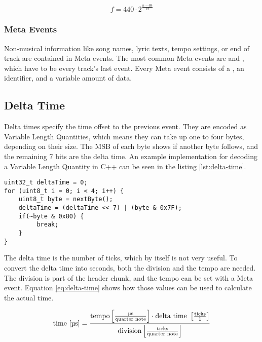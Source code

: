 \begin{equation}\label{eq:note-number}
    f = 440 \cdot 2^{\frac{n - 69}{12}}
\end{equation}

\subsubsection{Meta Events}

Non-musical information like song names, lyric texts, tempo settings, or end of track are contained in Meta events. The most common Meta events are  and , which have to be every track's last event. Every Meta event consists of a , an identifier, and a variable amount of data.

\subsection{Delta Time}

Delta times specify the time offset to the previous event. They are encoded as Variable Length Quantities, which means they can take up one to four bytes, depending on their size. The MSB %
of each byte shows if another byte follows, and the remaining 7 bits are the delta time. An example implementation for decoding a Variable Length Quantity in C++ can be seen in the listing \ref{lst:delta-time}.

\begin{lstlisting}[caption=Decoding the Delta Time, label=lst:delta-time]
uint32_t deltaTime = 0;
for (uint8_t i = 0; i < 4; i++) {
    uint8_t byte = nextByte();
    deltaTime = (deltaTime << 7) | (byte & 0x7F);
    if(~byte & 0x80) {
         break;
    }
}
\end{lstlisting}

The delta time is the number of ticks, which by itself is not very useful. To convert the delta time into seconds, both the division and the tempo are needed. The division is part of the header chunk, and the tempo can be set with a Meta event. Equation \ref{eq:delta-time} shows how those values can be used to calculate the actual time.

\begin{equation}\label{eq:delta-time}
    \textnormal{time [\textmu s]} = \frac{{\textnormal{tempo} \left[ \frac{\textnormal{\textmu s}}{\textnormal{quarter note}} \right] \cdot \textnormal{delta time } \left[\frac{\textnormal{ticks}}{1}\right]}}{\textnormal{division}  \left[ \frac{\textnormal{ticks}}{\textnormal{quarter note}} \right]}
\end{equation}

